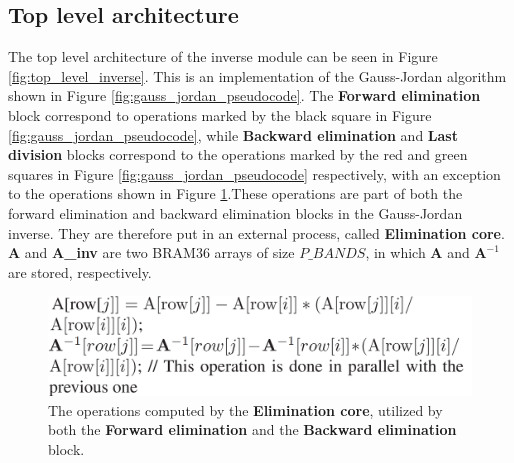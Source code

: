\subsection{Top level architecture}
The top level architecture of the inverse module can be seen in Figure \ref{fig:top_level_inverse}. This is an implementation of the Gauss-Jordan algorithm shown in Figure \ref{fig:gauss_jordan_pseudocode}. The \textbf{Forward elimination} block correspond to operations marked by the black square in Figure \ref{fig:gauss_jordan_pseudocode}, while \textbf{Backward elimination} and \textbf{Last division} blocks correspond to the operations marked by the red and green squares in Figure \ref{fig:gauss_jordan_pseudocode} respectively, with an exception to the operations shown in Figure \ref{fig:elimination_inner_core_pseudocode}.These operations are part of both the forward elimination and backward elimination blocks in the Gauss-Jordan inverse. They are therefore put in an external process, called \textbf{Elimination core}. 
\\

\textbf{A} and \textbf{A\_inv} are two BRAM36 arrays of size $P\_BANDS$, in which $\textbf{A}$ and $\textbf{A}^{-1}$ are stored, respectively. 

\begin{figure}[H]
\centering
   \includegraphics[scale=0.3]{images/inverse_hw/elimination_inner_core_pseudocode.PNG}
  \caption{The operations computed by the \textbf{Elimination core}, utilized by both the \textbf{Forward elimination} and the \textbf{Backward elimination} block.  } 
  \label{fig:elimination_inner_core_pseudocode}
\end{figure}


